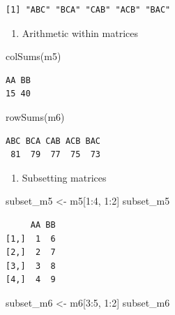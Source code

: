 \documentclass[
  letterpaper,
  DIV=11,
  numbers=noendperiod]{scrreprt}
\newenvironment{Shaded}{\begin{snugshade}}{\end{snugshade}}
\newcommand{\DecValTok}[1]{\textcolor[rgb]{0.68,0.00,0.00}{#1}}
\newcommand{\FunctionTok}[1]{\textcolor[rgb]{0.28,0.35,0.67}{#1}}
\newcommand{\NormalTok}[1]{\textcolor[rgb]{0.00,0.23,0.31}{#1}}
\newcommand{\OtherTok}[1]{\textcolor[rgb]{0.00,0.23,0.31}{#1}}
\newcommand{\SpecialCharTok}[1]{\textcolor[rgb]{0.37,0.37,0.37}{#1}}
\providecommand{\tightlist}{%
  \setlength{\itemsep}{0pt}\setlength{\parskip}{0pt}}\usepackage{longtable,booktabs,array}
\begin{document}
\begin{verbatim}
[1] "ABC" "BCA" "CAB" "ACB" "BAC"
\end{verbatim}

\begin{enumerate}
\def\labelenumi{\alph{enumi}.}
\setcounter{enumi}{6}
\tightlist
\item
  Arithmetic within matrices
\end{enumerate}

\begin{Shaded}
\begin{Highlighting}[]
\FunctionTok{colSums}\NormalTok{(m5)}
\end{Highlighting}
\end{Shaded}

\begin{verbatim}
AA BB 
15 40 
\end{verbatim}

\begin{Shaded}
\begin{Highlighting}[]
\FunctionTok{rowSums}\NormalTok{(m6)}
\end{Highlighting}
\end{Shaded}

\begin{verbatim}
ABC BCA CAB ACB BAC 
 81  79  77  75  73 
\end{verbatim}

\begin{enumerate}
\def\labelenumi{\alph{enumi}.}
\setcounter{enumi}{7}
\tightlist
\item
  Subsetting matrices
\end{enumerate}

\begin{Shaded}
\begin{Highlighting}[]
\NormalTok{subset\_m5 }\OtherTok{\textless{}{-}}\NormalTok{ m5[}\DecValTok{1}\SpecialCharTok{:}\DecValTok{4}\NormalTok{, }\DecValTok{1}\SpecialCharTok{:}\DecValTok{2}\NormalTok{]}
\NormalTok{subset\_m5}
\end{Highlighting}
\end{Shaded}

\begin{verbatim}
     AA BB
[1,]  1  6
[2,]  2  7
[3,]  3  8
[4,]  4  9
\end{verbatim}

\begin{Shaded}
\begin{Highlighting}[]
\NormalTok{subset\_m6 }\OtherTok{\textless{}{-}}\NormalTok{ m6[}\DecValTok{3}\SpecialCharTok{:}\DecValTok{5}\NormalTok{, }\DecValTok{1}\SpecialCharTok{:}\DecValTok{2}\NormalTok{]}
\NormalTok{subset\_m6}
\end{Highlighting}
\end{Shaded}
\end{document}
